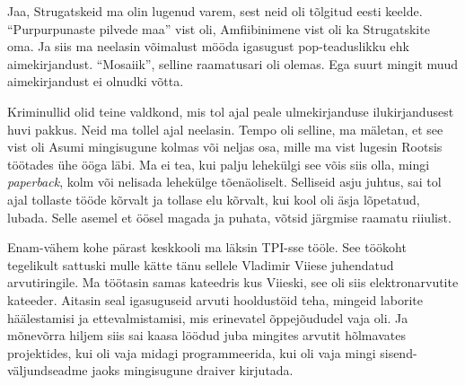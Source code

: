 Jaa, Strugatskeid ma olin lugenud varem, sest neid oli tõlgitud eesti keelde. 
\enquote{Purpurpunaste pilvede maa}\label{sisu:purpur} vist oli,  Amfiibinimene vist oli ka 
Strugatskite oma. Ja siis ma neelasin võimalust mööda igasugust pop-teaduslikku ehk 
aimekirjandust. \enquote{Mosaiik}, selline raamatusari oli olemas. Ega suurt mingit muud 
aimekirjandust ei olnudki võtta.

Kriminullid olid teine valdkond, mis tol ajal peale  ulmekirjanduse 
ilukirjandusest huvi pakkus. Neid ma tollel ajal neelasin. Tempo oli selline, 
ma mäletan, et see vist oli Asumi mingisugune kolmas või neljas osa, mille ma 
vist lugesin Rootsis töötades ühe ööga läbi. Ma ei tea, kui palju lehekülgi see 
võis siis olla, mingi \emph{paperback}, kolm või nelisada lehekülge 
tõenäoliselt. Selliseid asju juhtus, sai tol ajal tollaste tööde kõrvalt ja 
tollase elu kõrvalt, kui  kool oli äsja lõpetatud, lubada. Selle asemel et 
öösel magada ja puhata, võtsid järgmise raamatu riiulist.


Enam-vähem kohe pärast keskkooli ma läksin TPI-sse tööle. See töökoht tegelikult sattuski mulle kätte tänu sellele 
Vladimir Viiese juhendatud arvutiringile. Ma 
töötasin samas kateedris kus Viieski, see oli siis 
elektronarvutite kateeder. Aitasin seal igasuguseid arvuti hooldustöid teha, mingeid laborite 
häälestamisi ja  ettevalmistamisi, mis erinevatel õppejõududel vaja oli. Ja 
mõnevõrra hiljem siis sai kaasa löödud juba mingites arvutit hõlmavates 
projektides,  kui oli vaja midagi programmeerida, kui oli vaja mingi 
sisend-väljundseadme jaoks mingisugune draiver kirjutada. 

